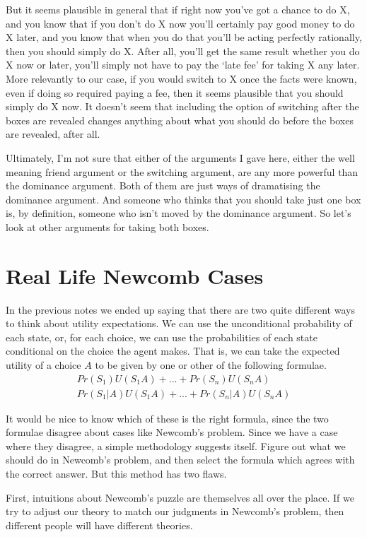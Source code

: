 But it seems plausible in general that if right now you've got a chance to do X, and you know that if you don't do X now you'll certainly pay good money to do X later, and you know that when you do that you'll be acting perfectly rationally, then you should simply do X. After all, you'll get the same result whether you do X now or later, you'll simply not have to pay the `late fee' for taking X any later. More relevantly to our case, if you would switch to X once the facts were known, even if doing so required paying a fee, then it seems plausible that you should simply do X now. It doesn't seem that including the option of switching after the boxes are revealed changes anything about what you should do before the boxes are revealed, after all.

Ultimately, I'm not sure that either of the arguments I gave here, either the well meaning friend argument or the switching argument, are any more powerful than the dominance argument. Both of them are just ways of dramatising the dominance argument. And someone who thinks that you should take just one box is, by definition, someone who isn't moved by the dominance argument. So let's look at other arguments for taking both boxes.

\section{Real Life Newcomb Cases}
In the previous notes we ended up saying that there are two quite different ways to think about utility expectations. We can use the unconditional probability of each state, or, for each choice, we can use the probabilities of each state conditional on the choice the agent makes. That is, we can take the expected utility of a choice $A$ to be given by one or other of the following formulae.
\begin{align*}
Pr(S_1)U(S_1A) + ...  + Pr(S_n)U(S_nA) \\
Pr(S_1|A)U(S_1A) + ...  + Pr(S_n|A)U(S_nA)
\end{align*}

It would be nice to know which of these is the right formula, since the two formulae disagree about cases like Newcomb's problem. Since we have a case where they disagree, a simple methodology suggests itself. Figure out what we should do in Newcomb's problem, and then select the formula which agrees with the correct answer. But this method has two flaws.

First, intuitions about Newcomb's puzzle are themselves all over the place. If we try to adjust our theory to match our judgments in Newcomb's problem, then different people will have different theories.

